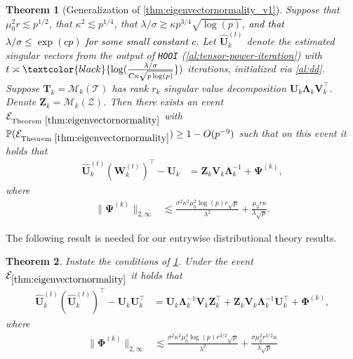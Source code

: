 \documentclass[10pt]{article}
\newcommand{\0}{{\mathbf{0}}}
\newcommand{\1}{{\mathbf{1}}}
\newcommand{\U}{{\mathbf{U}}}
\renewcommand{\t}{^{\top}}
\newcommand{\uhat}{\mathbf{\hat{U}}}
\newtheorem{theorem}{Theorem}
\newcommand{\p}{\mathbb{P}}
\newcommand{\inv}{^{-1}}
\renewcommand{\hat}{\widehat}
\renewcommand{\hat}{\widehat}
\begin{document}
\begin{theorem}[Generalization of \cref{thm:eigenvectornormality_v1}] \label{thm:eigenvectornormality}
Suppose that $\mu_0^2 r \lesssim p^{1/2}$, that $\kappa^2 \lesssim p^{1/4}$,  that $\lambda/\sigma \gtrsim \kappa p^{3/4} \sqrt{\log(p)}$, \textcolor{black}{and that $\lambda/\sigma \leq \exp(c p)$ for some small constant $c$}. Let $\uhat_k^{(t)}$ denote the estimated singular vectors from the output of \texttt{HOOI} (\cref{al:tensor-power-iteration}) with $t \asymp \textcolor{black}{\log( \frac{\lambda/\sigma}{C \kappa \sqrt{p\log(p)}}})$%
iterations, initialized via \cref{al:dd}.  Suppose $\mathbf{T}_k = \mathcal{M}_k(\mathcal{T})$ has rank $r_k$ singular value decomposition $\U_k \mathbf{\Lambda}_k \mathbf{V}_k\t$. %
Denote $\mathbf{Z}_k = \mathcal{M}_k(\mathcal{Z})$.
Then there exists an event $\mathcal{E}_{\mathrm{Theorem} \ \ref{thm:eigenvectornormality}}$ with $\p(\mathcal{E}_{\mathrm{Theorem} \ \ref{thm:eigenvectornormality}}) \geq 1 - O(p^{-9})$ such that on this event it holds that
 \begin{align*}
     \uhat_k^{(t)} ( \mathbf{W}_k^{(t)})\t - \U_k &= \mathbf{Z}_k \mathbf{V}_k \mathbf{\Lambda}_k\inv + \mathbf{\Psi}^{(k)},
 \end{align*}
 where 
 \begin{align*}
     \big\| \mathbf{\Psi}^{(k)} \big\|_{2,\infty} &\lesssim \frac{\sigma^2 \kappa^2 \mu_0^2 \log(p) r \sqrt{p}}{\lambda^2} + \frac{\mu_0 r \kappa}{\lambda \sqrt{p}}.
 \end{align*}
 \end{theorem}
 

 
 \noindent
 The following result is needed for our entrywise distributional theory results.
  \begin{theorem} \label{cor:asymptoticnormality_projection}
  Instate the conditions of \cref{thm:eigenvectornormality}. Under the event $\mathcal{E}_{\mathrm{\cref{thm:eigenvectornormality}}}$ it holds that
\begin{align*}
    \uhat_k^{(t)} (\uhat_k^{(t)})\t - \U_k \U_k\t &= \U_k \mathbf{\Lambda}_k\inv \mathbf{V}_k \mathbf{Z}_k\t + \mathbf{Z}_k \mathbf{V}_k \mathbf{\Lambda}_k\inv \U_k\t + \mathbf{\Phi}^{(k)},
\end{align*}
where
\begin{align*}
    \big\| \mathbf{\Phi}^{(k)} \big\|_{2,\infty} &\lesssim %
    \frac{\sigma^2\kappa^2 \mu_0^3 \log(p) r^{3/2} \sqrt{p}}{\lambda^2}   + \frac{\sigma \mu_0^2 r^{3/2} \kappa}{\lambda \sqrt{p}}
\end{align*}
\end{theorem}
 
\end{document}
